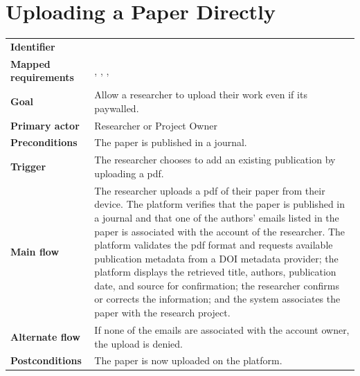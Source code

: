 \section{Uploading a Paper Directly}
\begin{tabularx}{\linewidth}{L{3.5cm}Y}
\toprule
\textbf{Identifier} & \\
\textbf{Mapped requirements} & , , , \\
\textbf{Goal} & Allow a researcher to upload their work even if its paywalled.\\
\textbf{Primary actor} & Researcher or Project Owner\\
\textbf{Preconditions} & The paper is published in a journal.\\
\textbf{Trigger} & The researcher chooses to add an existing publication by uploading a pdf.\\
\textbf{Main flow} & The researcher uploads a pdf of their paper from their device. The platform verifies that the paper is published in a journal and that one of the authors' emails listed in the paper is associated with the account of the researcher. The platform validates the pdf format and
requests available publication metadata from a DOI metadata
provider; the platform displays the retrieved title, authors, publication
date, and source for confirmation; the researcher confirms or corrects
the information; and the system associates the paper with the research project.\\
\textbf{Alternate flow} & If none of the emails are associated with the account owner, the upload is denied.\\
\textbf{Postconditions} & The paper is now uploaded on the platform. \\
\bottomrule
\end{tabularx}